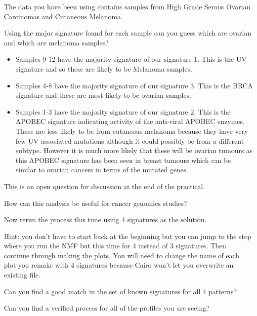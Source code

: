 \begin{information}
The data you have been using contains samples from High Grade Serous Ovarian Carcinomas and Cutaneous Melanoma. 
\end{information}

\begin{questions}
Using the major signature found for each sample can you guess which are ovarian and which are melanoma samples?
\end{questions}

\begin{answer}
\begin{itemize}
\item Samples 9-12 have the majority signature of our signature 1. This is the UV signature and so these are likely to be Melanoma samples.
\item Samples 4-8 have the majority signature of our signature 3. This is the BRCA signature and these are most likely to be ovarian samples.
\item Samples 1-3 have the majority signature of our signature 2. This is the APOBEC signature indicating activity of the anti-viral APOBEC enzymes. These are less likely to be from cutaneous melanoma because they have very few UV associated mutations although it could possibly be from a different subtype. However it is much more likely that these will be ovarian tumours as this APOBEC signature has been seen in breast tumours which can be similar to ovarian cancers in terms of the mutated genes.
\end{itemize}
\end{answer}

\begin{questions}
This is an open question for discussion at the end of the practical.

How can this analysis be useful for cancer genomics studies?
\end{questions}

\begin{advanced}
Now rerun the process this time using 4 signatures as the solution.
\vspace{4 mm}
\begin{information}
Hint: you don't have to start back at the beginning but you can jump
to the step where you run the NMF but this time for 4 instead of 3
signatures. Then continue through making the plots.
\vspace{4 mm}
You will need to change the name of each plot you remake with 4
signatures because Cairo won't let you overwrite an existing file.
\end{information}
\begin{questions}
Can you find a good match in the set of known signatures for all 4 patterns? 

Can you find a verified process for all of the profiles you are seeing? 
\end{questions}
\end{advanced}

